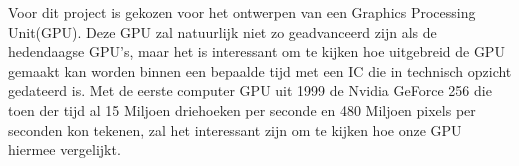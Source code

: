 Voor dit project is gekozen voor het ontwerpen van een Graphics Processing Unit(GPU). Deze GPU zal natuurlijk niet zo geadvanceerd zijn als de hedendaagse GPU's, maar het is interessant om te kijken hoe uitgebreid de GPU gemaakt kan worden binnen een bepaalde tijd met een IC die in technisch opzicht gedateerd is. Met de eerste computer GPU uit 1999 de Nvidia GeForce 256 die toen der tijd al 15 Miljoen driehoeken per seconde en 480 Miljoen pixels per seconden kon tekenen, zal het interessant zijn om te kijken hoe onze GPU hiermee vergelijkt.